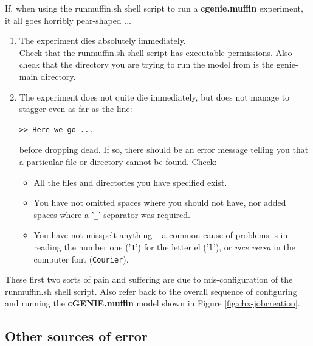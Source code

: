 \documentclass[11pt,fleqn]{book} %
\begin{document}
If, when using the \textsf{\footnotesize runmuffin.sh} shell script to run a \textbf{cgenie.muffin} experiment, it all goes horribly pear-shaped ... 
\vspace{1mm}
\begin{enumerate}
   
\vspace{1mm}
\item The experiment dies absolutely immediately.
\\Check that the \textsf{\footnotesize runmuffin.sh} shell script has executable permissions. Also check that the directory you are trying to run the model from is the \textsf{\footnotesize genie-main} directory.
        
\item The experiment does not quite die immediately, but does not manage to stagger even as far as the line:
\vspace{-4pt}\begin{verbatim}
>> Here we go ...
\end{verbatim}\vspace{-4pt}
before dropping dead. If so, there should be an error message telling you that a particular file or directory cannot be found. Check:
        
\begin{itemize}
\item All the files and directories you have specified exist.
\item You have not omitted spaces where you should not have, nor added spaces where a '\texttt{\_}' separator was required.
\item You have not misspelt anything -- a common cause of problems is in reading the number one ('\texttt{1}') for the letter el ('\texttt{l}'), or \textit{vice versa} in the computer font (\texttt{Courier}).
\end{itemize}
        
\end{enumerate}
\vspace{2mm}

\noindent These first two sorts of pain and suffering are due to mis-configuration of the \textsf{\footnotesize runmuffin.sh} shell script. Also refer back to the overall sequence of configuring and running the \textbf{cGENIE.muffin} model shown in Figure \ref{fig:chx-jobcreation}.


\subsection{Other sources of error}
\end{document}
